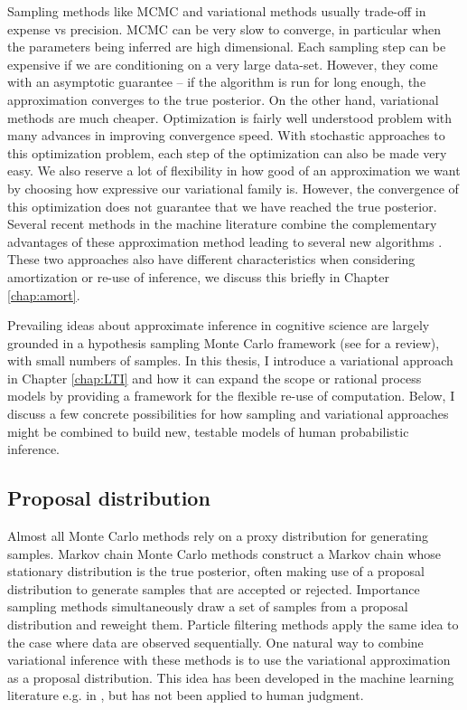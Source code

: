 Sampling methods like MCMC and variational methods usually trade-off in expense vs precision. MCMC can be very slow to converge, in particular when the parameters being inferred are high dimensional. Each sampling step can be expensive if we are conditioning on a very large data-set. However, they come with an asymptotic guarantee -- if the algorithm is run for long enough, the approximation converges to the true posterior. On the other hand, variational methods are much cheaper. Optimization is fairly well understood problem with many advances in improving convergence speed. With stochastic approaches to this optimization problem, each step of the optimization can also be made very easy. We also reserve a lot of flexibility in how good of an approximation we want by choosing how expressive our variational family is.  However, the convergence of this optimization does not guarantee that we have reached the true posterior. Several recent methods in the machine literature combine the complementary advantages of these approximation method leading to several new algorithms \citep{li2017approximate, naesseth2017variational, ruiz2019contrast}. These two approaches also have different characteristics when considering amortization or re-use of inference, we discuss this briefly in Chapter \ref{chap:amort}. 

Prevailing ideas about approximate inference in cognitive science are largely grounded in a hypothesis sampling Monte Carlo framework (see \citet{sanborn2016bayesian} for a review), with small numbers of samples. In this thesis, I introduce a variational approach in Chapter \ref{chap:LTI} and how it can expand the scope or rational process models by providing a framework for the flexible re-use of computation. Below, I discuss a few concrete possibilities for how sampling and variational approaches might be combined to build new, testable models of human probabilistic inference.

\subsection{Proposal distribution}

Almost all Monte Carlo methods rely on a proxy distribution for generating samples. Markov chain Monte Carlo methods construct a Markov chain whose stationary distribution is the true posterior, often making use of a proposal distribution to generate samples that are accepted or rejected. Importance sampling methods simultaneously draw a set of samples from a proposal distribution and reweight them. Particle filtering methods apply the same idea to the case where data are observed sequentially. One natural way to combine variational inference with these methods is to use the variational approximation as a proposal distribution. This idea has been developed in the machine learning literature e.g. in \citet{de2001variational,gu2015neural}, but has not been applied to human judgment.

